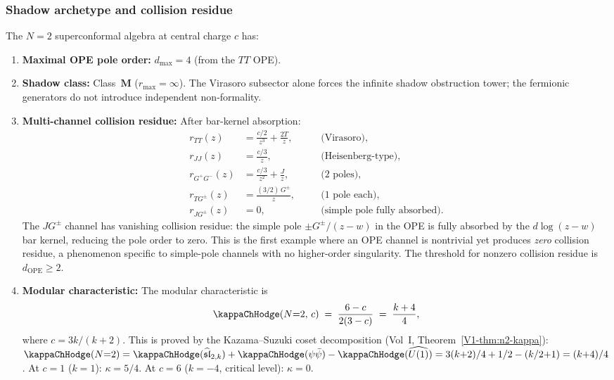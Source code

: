 \subsubsection{Shadow archetype and collision residue}

\begin{proposition}[$N{=}2$ SCA shadow data; \ClaimStatusProvedHere]
\label{prop:N2-shadow}
The $N{=}2$ superconformal algebra at central charge $c$ has:
\begin{enumerate}[label=\textup{(\roman*)},nosep]
\item \textbf{Maximal OPE pole order:} $d_{\max} = 4$
 \textup{(}from the $TT$ OPE\textup{)}.

\item \textbf{Shadow class:} Class~$\mathbf{M}$
 \textup{(}$r_{\max} = \infty$\textup{)}. The Virasoro subsector
 alone forces the infinite shadow obstruction tower; the fermionic
 generators do not introduce independent non-formality.

\item \textbf{Multi-channel collision residue:}
 After bar-kernel absorption:
 \begin{align*}
 r_{TT}(z) &= \frac{c/2}{z^3} + \frac{2T}{z},
 &\quad&\text{(Virasoro),} \\
 r_{JJ}(z) &= \frac{c/3}{z},
 &&\text{(Heisenberg-type),} \\
 r_{G^+G^-}(z) &= \frac{c/3}{z^2} + \frac{J}{z},
 &&\text{(2 poles),} \\
 r_{TG^\pm}(z) &= \frac{(3/2)\,G^\pm}{z},
 &&\text{(1 pole each),} \\
 r_{JG^\pm}(z) &= 0,
 &&\text{(simple pole fully absorbed).}
 \end{align*}
 The $JG^\pm$ channel has vanishing collision residue: the simple pole
 $\pm G^\pm/(z-w)$ in the OPE is fully absorbed by the $d\log(z-w)$
 bar kernel, reducing the pole order to zero. This is the first
 example where an OPE channel is nontrivial yet produces
 \emph{zero} collision residue, a phenomenon specific to
 simple-pole channels with no higher-order singularity. The
 threshold for nonzero collision residue is
 $d_{\mathrm{OPE}} \ge 2$.

\item \textbf{Modular characteristic:}
 The modular characteristic is
 \[
 \kappaChHodge(N{=}2,\, c) \;=\; \frac{6-c}{2(3-c)}
 \;=\; \frac{k+4}{4},
 \]
 where $c = 3k/(k+2)$. This is proved by the Kazama--Suzuki coset
 decomposition \textup{(}Vol~I, Theorem~\ref{V1-thm:n2-kappa}\textup{)}:
 $\kappaChHodge(N{=}2) = \kappaChHodge(\widehat{\mathfrak{sl}}_{2,k})
 + \kappaChHodge(\psi\bar\psi) - \kappaChHodge(\widehat{U(1)})
 = 3(k{+}2)/4 + 1/2 - (k/2{+}1) = (k{+}4)/4$.
 At $c = 1$ \textup{(}$k = 1$\textup{)}: $\kappa = 5/4$.
 At $c = 6$ \textup{(}$k = -4$, critical level\textup{)}:
 $\kappa = 0$.


\end{enumerate}
\end{proposition}
